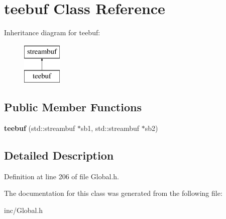 \hypertarget{classteebuf}{\section{teebuf Class Reference}
\label{classteebuf}
}
Inheritance diagram for teebuf\-:\begin{figure}[H]
\begin{center}
\leavevmode
\includegraphics[height=2.000000cm]{classteebuf}
\end{center}
\end{figure}
\subsection*{Public Member Functions}
\begin{DoxyCompactItemize}
\item 
\hypertarget{classteebuf_a874f4618a07d33370216658636c23558}{{\bfseries teebuf} (std\-::streambuf $\ast$sb1, std\-::streambuf $\ast$sb2)}\label{classteebuf_a874f4618a07d33370216658636c23558}

\end{DoxyCompactItemize}


\subsection{Detailed Description}


Definition at line 206 of file Global.\-h.



The documentation for this class was generated from the following file\-:\begin{DoxyCompactItemize}
\item 
inc/Global.\-h\end{DoxyCompactItemize}
